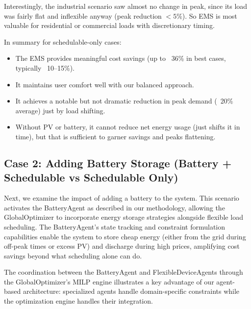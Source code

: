 \documentclass[12pt,a4paper]{article}
\begin{document}
Interestingly, the industrial scenario saw almost no change in peak, since its load was fairly flat and inflexible anyway (peak reduction $<5\%$). So EMS is most valuable for residential or commercial loads with discretionary timing.

In summary for schedulable-only cases:
\begin{itemize}
    \item The EMS provides meaningful cost savings (up to ~36\% in best cases, typically ~10--15\%).
    \item It maintains user comfort well with our balanced approach.
    \item It achieves a notable but not dramatic reduction in peak demand (~20\% average) just by load shifting.
    \item Without PV or battery, it cannot reduce net energy usage (just shifts it in time), but that is sufficient to garner savings and peaks flattening.
\end{itemize}
\FloatBarrier

\subsection{Case 2: Adding Battery Storage (Battery + Schedulable vs Schedulable Only)}
Next, we examine the impact of adding a battery to the system. This scenario activates the BatteryAgent as described in our methodology, allowing the GlobalOptimizer to incorporate energy storage strategies alongside flexible load scheduling. The BatteryAgent's state tracking and constraint formulation capabilities enable the system to store cheap energy (either from the grid during off-peak times or excess PV) and discharge during high prices, amplifying cost savings beyond what scheduling alone can do.

The coordination between the BatteryAgent and FlexibleDeviceAgents through the GlobalOptimizer's MILP engine illustrates a key advantage of our agent-based architecture: specialized agents handle domain-specific constraints while the optimization engine handles their integration.
\end{document}
